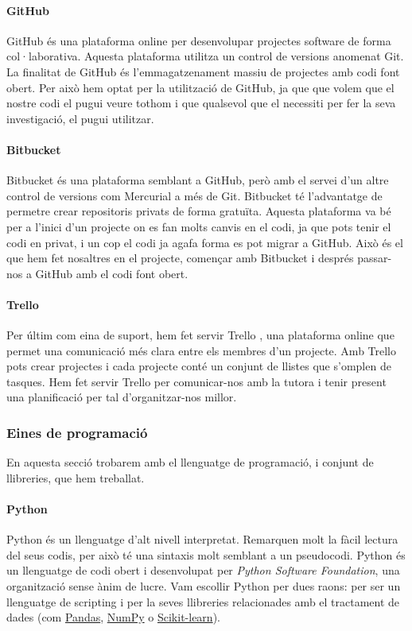 \documentclass[12pt,a4paper,catalan]{article}
\begin{document}
\paragraph{GitHub}
GitHub \cite{github} és una plataforma online per desenvolupar projectes software de forma col·laborativa. Aquesta plataforma utilitza un control de versions anomenat Git. La finalitat de GitHub és l'emmagatzenament massiu de projectes amb codi font obert. Per això hem optat per la utilització de GitHub, ja que que volem que el nostre codi el pugui veure tothom i que qualsevol que el necessiti per fer la seva investigació, el pugui utilitzar.

\paragraph{Bitbucket}
Bitbucket \cite{bitbucket} és una plataforma semblant a GitHub, però amb el servei d'un altre control de versions com Mercurial a més de Git. Bitbucket té l'advantatge de permetre crear repositoris privats de forma gratuïta. Aquesta plataforma va bé per a l'inici d'un projecte on es fan molts canvis en el codi, ja que pots tenir el codi en privat, i un cop el codi ja agafa forma es pot migrar a GitHub. Això és el que hem fet nosaltres en el projecte, començar amb Bitbucket i després passar-nos a GitHub amb el codi font obert.

\paragraph{Trello}
Per últim com eina de suport, hem fet servir Trello \cite{trello}, una plataforma online que permet una comunicació més clara entre els membres d'un projecte. Amb Trello pots crear projectes i cada projecte conté un conjunt de llistes que s'omplen de tasques. Hem fet servir Trello per comunicar-nos amb la tutora i tenir present una planificació per tal d'organitzar-nos millor.

\newpage
\subsubsection{Eines de programació}
En aquesta secció trobarem amb el llenguatge de programació, i conjunt de llibreries, que hem treballat.

\paragraph{Python}
Python \cite{python} és un llenguatge d'alt nivell interpretat. Remarquen molt la fàcil lectura del seus codis, per això té una sintaxis molt semblant a un pseudocodi. Python és un llenguatge de codi obert i desenvolupat per \textit{Python Software Foundation}, una organització sense ànim de lucre. Vam escollir Python per dues raons: per ser un llenguatge de scripting i per la seves llibreries relacionades amb el tractament de dades (com \hyperlink{pandas}{Pandas}, \hyperlink{numpy}{NumPy} o \hyperlink{sklearn}{Scikit-learn}).
\end{document}
